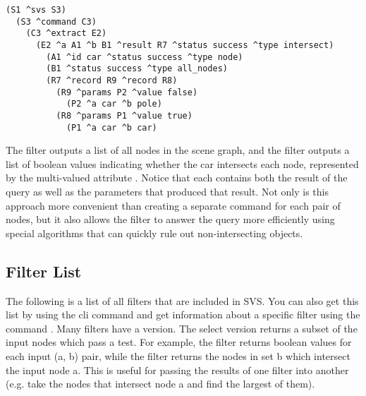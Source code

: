 \begin{verbatim}
(S1 ^svs S3)
  (S3 ^command C3)
    (C3 ^extract E2)
      (E2 ^a A1 ^b B1 ^result R7 ^status success ^type intersect)
        (A1 ^id car ^status success ^type node)
        (B1 ^status success ^type all_nodes)
        (R7 ^record R9 ^record R8)
          (R9 ^params P2 ^value false)
            (P2 ^a car ^b pole)
          (R8 ^params P1 ^value true)
            (P1 ^a car ^b car)
\end{verbatim}

The  filter outputs a list of all nodes in the scene graph, and the  filter outputs a list of boolean values indicating whether the car intersects each node, represented by the multi-valued attribute .
Notice that each  contains both the result of the query as well as the parameters that produced that result.
Not only is this approach more convenient than creating a separate command for each pair of nodes, but it also allows the  filter to answer the query more efficiently using special algorithms that can quickly rule out non-intersecting objects.


\subsection{Filter List}

The following is a list of all filters that are included in SVS. 
You can also get this list by using the cli command  and 
get information about a specific filter using the command .
Many filters have a  version. The select version returns a subset
of the input nodes which pass a test. For example, the  filter returns
boolean values for each input (a, b) pair, while the  filter
returns the nodes in set b which intersect the input node a. This is useful for passing
the results of one filter into another (e.g. take the nodes that intersect node a and find
the largest of them). 


